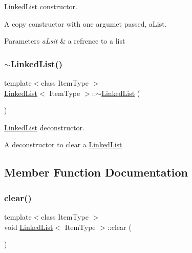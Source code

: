 \hyperlink{classLinkedList}{Linked\+List} constructor. 

A copy constructor with one argumet passed, a\+List. 
\begin{DoxyParams}{Parameters}
{\em a\+Lsit} & a refrence to a list \\
\hline
\end{DoxyParams}
\mbox{\label{classLinkedList_a66aee17d756fe0e002375897383c180b}} 
\subsubsection{\texorpdfstring{$\sim$\+Linked\+List()}{~LinkedList()}}
{\footnotesize\ttfamily template$<$class Item\+Type $>$ \\
\hyperlink{classLinkedList}{Linked\+List}$<$ Item\+Type $>$\+::$\sim$\hyperlink{classLinkedList}{Linked\+List} (\begin{DoxyParamCaption}{ }\end{DoxyParamCaption})\hspace{0.3cm}{\ttfamily [virtual]}}



\hyperlink{classLinkedList}{Linked\+List} deconstructor. 

A deconstructor to clear a \hyperlink{classLinkedList}{Linked\+List} 

\subsection{Member Function Documentation}
\mbox{\label{classLinkedList_a7d1d9cf83eef67b6c4d700a3cc5970e1}} 
\subsubsection{\texorpdfstring{clear()}{clear()}}
{\footnotesize\ttfamily template$<$class Item\+Type $>$ \\
void \hyperlink{classLinkedList}{Linked\+List}$<$ Item\+Type $>$\+::clear (\begin{DoxyParamCaption}{ }\end{DoxyParamCaption})\hspace{0.3cm}{\ttfamily [virtual]}}



